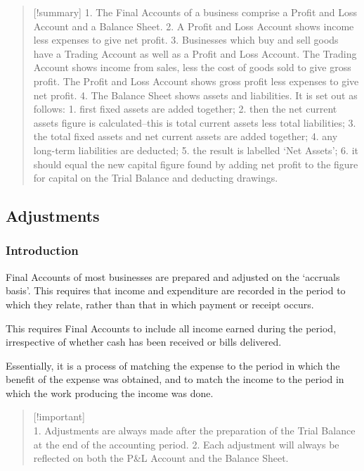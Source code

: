 \documentclass[
]{article}
\begin{document}
\begin{quote}
{[}!summary{]} 1. The Final Accounts of a business comprise a Profit and
Loss Account and a Balance Sheet. 2. A Profit and Loss Account shows
income less expenses to give net profit. 3. Businesses which buy and
sell goods have a Trading Account as well as a Profit and Loss Account.
The Trading Account shows income from sales, less the cost of goods sold
to give gross profit. The Profit and Loss Account shows gross profit
less expenses to give net profit. 4. The Balance Sheet shows assets and
liabilities. It is set out as follows: 1. first fixed assets are added
together; 2. then the net current assets figure is calculated--this is
total current assets less total liabilities; 3. the total fixed assets
and net current assets are added together; 4. any long-term liabilities
are deducted; 5. the result is labelled `Net Assets'; 6. it should equal
the new capital figure found by adding net profit to the figure for
capital on the Trial Balance and deducting drawings.
\end{quote}

\hypertarget{adjustments}{%
\subsection{Adjustments}\label{adjustments}}

\hypertarget{introduction-2}{%
\subsubsection{Introduction}\label{introduction-2}}

Final Accounts of most businesses are prepared and adjusted on the
`accruals basis'. This requires that income and expenditure are recorded
in the period to which they relate, rather than that in which payment or
receipt occurs.

This requires Final Accounts to include all income earned during the
period, irrespective of whether cash has been received or bills
delivered.

Essentially, it is a process of matching the expense to the period in
which the benefit of the expense was obtained, and to match the income
to the period in which the work producing the income was done.

\begin{quote}
{[}!important{]}\\
1. Adjustments are always made after the preparation of the Trial
Balance at the end of the accounting period. 2. Each adjustment will
always be reflected on both the P\&L Account and the Balance Sheet.
\end{quote}
\end{document}
